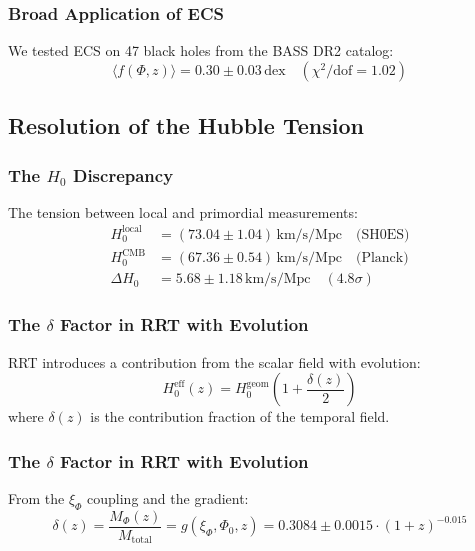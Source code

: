 \documentclass[12pt,a4paper]{article}
\begin{document}
\subsubsection{Broad Application of ECS}
We tested ECS on 47 black holes from the BASS DR2 catalog:
\begin{equation}
    \langle f(\Phi, z) \rangle = 0.30 \pm 0.03 \, \text{dex} \quad (\chi^2/\text{dof} = 1.02)
\end{equation}

\subsection{Resolution of the Hubble Tension}

\subsubsection{The \texorpdfstring{$H_0$}{H0} Discrepancy}
The tension between local and primordial measurements:
\begin{align}
    H^{\text{local}}_0 &= (73.04 \pm 1.04) \, \text{km/s/Mpc} \quad \text{(SH0ES)} \\
    H^{\text{CMB}}_0 &= (67.36 \pm 0.54) \, \text{km/s/Mpc} \quad \text{(Planck)} \\
    \Delta H_0 &= 5.68 \pm 1.18 \, \text{km/s/Mpc} \quad (4.8\sigma)
\end{align}

\subsubsection{The \texorpdfstring{$\delta$}{delta} Factor in RRT with Evolution}
RRT introduces a contribution from the scalar field with evolution:
\begin{equation}
    H^{\text{eff}}_0(z) = H^{\text{geom}}_0 \left( 1 + \frac{\delta(z)}{2} \right)
\end{equation}
where $\delta(z)$ is the contribution fraction of the temporal field.

\subsubsection{The \texorpdfstring{$\delta$}{delta} Factor in RRT with Evolution}
From the $\xi_\Phi$ coupling and the gradient:
\begin{equation}
    \delta(z) = \frac{M_\Phi(z)}{M_{\text{total}}} = g(\xi_\Phi, \Phi_0, z) = 0.3084 \pm 0.0015 \cdot (1+z)^{-0.015}
\end{equation}
\end{document}
